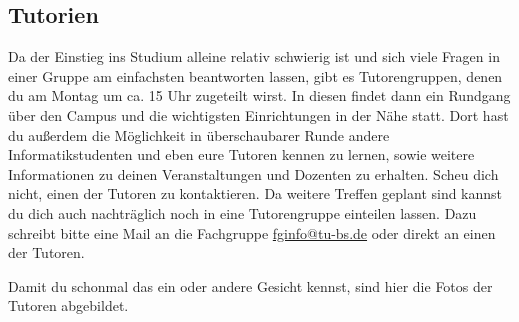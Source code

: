 \begin{multicols}{2}
\subsection{Tutorien}
Da der Einstieg ins Studium alleine relativ schwierig ist und sich viele Fragen in einer Gruppe am einfachsten beantworten lassen, gibt es Tutorengruppen, denen du am Montag um ca. 15 Uhr zugeteilt wirst. 
In diesen findet dann ein Rundgang über den Campus und die wichtigsten Einrichtungen in der Nähe statt. 
Dort hast du außerdem die Möglichkeit in überschaubarer Runde andere Informatikstudenten und eben eure Tutoren kennen zu lernen, sowie weitere Informationen zu deinen Veranstaltungen und Dozenten zu erhalten.
Scheu dich nicht, einen der Tutoren zu kontaktieren. Da weitere Treffen geplant sind kannst du dich auch nachträglich noch in eine Tutorengruppe einteilen lassen. Dazu schreibt bitte eine Mail an die Fachgruppe \url{fginfo@tu-bs.de} oder direkt an einen der Tutoren.


\ifpdf
Damit du schonmal das ein oder andere Gesicht kennst, sind hier die Fotos der Tutoren abgebildet.
\end{multicols}



